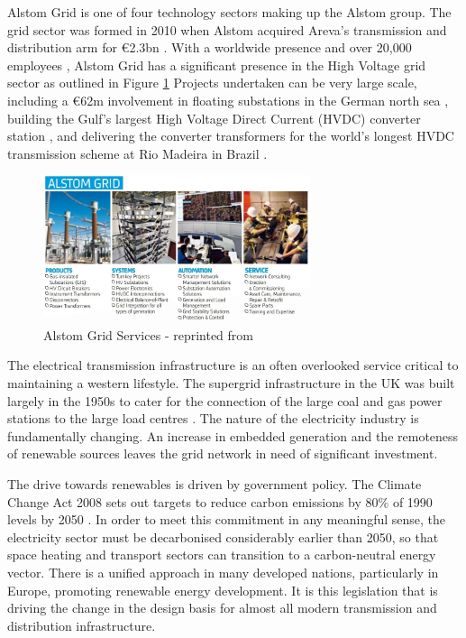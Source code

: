{}
Alstom Grid is one of four technology sectors making up the Alstom group.
The grid sector was formed in 2010 when Alstom acquired Areva's transmission and distribution arm \cite{AlstomGridInfo} for \euro2.3bn \cite{AlstomAreva}. 
With a worldwide presence and over 20,000 employees \cite{AlstomGridInfo}, Alstom Grid has a significant presence in the High Voltage grid sector as outlined in Figure \ref{figure:AlstomGrid}
Projects undertaken can be very large scale, including a \euro62m involvement in floating substations in the German north sea \cite{AlstomGridInfo}, building the Gulf's largest High Voltage Direct Current (HVDC) converter station \cite{AlstomGulf}, and delivering the converter transformers for the world's longest HVDC transmission scheme at Rio Madeira in Brazil \cite{AlstomRio}.

\begin{figure}[!h]
\centering
\includegraphics[width = 0.7\textwidth]{Figures/AlstomGrid.jpg}
\caption{Alstom Grid Services - reprinted from \cite{AlstomGridInfo}}
\label{figure:AlstomGrid}
\end{figure}

The electrical transmission infrastructure is an often overlooked service critical to maintaining a western lifestyle.
The supergrid infrastructure in the UK was built largely in the 1950s to cater for the connection of the large coal and gas power stations to the large load centres \cite{NationalGrid75}.
The nature of the electricity industry is fundamentally changing.
An increase in embedded generation and the remoteness of renewable sources leaves the grid network in need of significant investment.

The drive towards renewables is driven by government policy.
The Climate Change Act 2008 sets out targets to reduce carbon emissions by 80\% of 1990 levels by 2050 \cite{ClimateChangeAct08}.
In order to meet this commitment in any meaningful sense, the electricity sector must be decarbonised considerably earlier than 2050, so that space heating and transport sectors can transition to a carbon-neutral energy vector.
There is a unified approach in many developed nations, particularly in Europe, promoting renewable energy development.
It is this legislation that is driving the change in the design basis for almost all modern transmission and distribution infrastructure.

